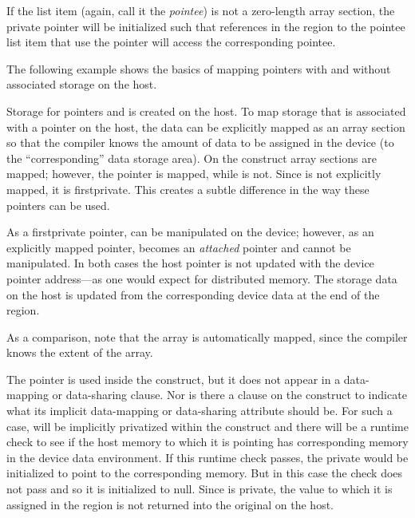 If the list item (again, call it the \emph{pointee}) is not a zero-length array section, the private pointer will be initialized such that references in the  region to the pointee list item that use the pointer will access the corresponding pointee.

The following example shows the basics of mapping pointers with and without
associated storage on the host.

Storage for pointers  and  is created on the host. 
To map storage that is associated with a pointer on the host, the data can be
explicitly mapped as an array section so that the compiler knows 
the amount of data to be assigned in the device (to the ``corresponding'' data storage area).
On the  construct array sections are mapped; however, the pointer 
is mapped, while  is not. Since  is not explicitly mapped, it is
firstprivate.  This creates a subtle difference in the way these pointers can be used.

As a firstprivate pointer,  can be manipulated on the device;
however, as an explicitly mapped pointer, 
 becomes an \emph{attached} pointer and cannot be manipulated.
In both cases the host pointer is not updated with the device pointer 
address---as one would expect for distributed memory. 
The storage data on the host is updated from the corresponding device
data at the end of the  region.

As a comparison, note that the  array is automatically mapped, 
since the compiler knows the extent of the array. 

The pointer  is used inside the  construct, but it does
not appear in a data-mapping or data-sharing clause. Nor is there a
 clause on the construct to indicate what its implicit
data-mapping or data-sharing attribute should be. For such a case, 
will be implicitly privatized within the construct and there will be a runtime
check to see if the host memory to which it is pointing has corresponding memory
in the device data environment. If this runtime check passes, the private
 would be initialized to point to the corresponding memory. But in
this case the check does not pass and so it is initialized to null.
Since  is private, the value to which it is assigned in the
 region is not returned into the original  on the host.


